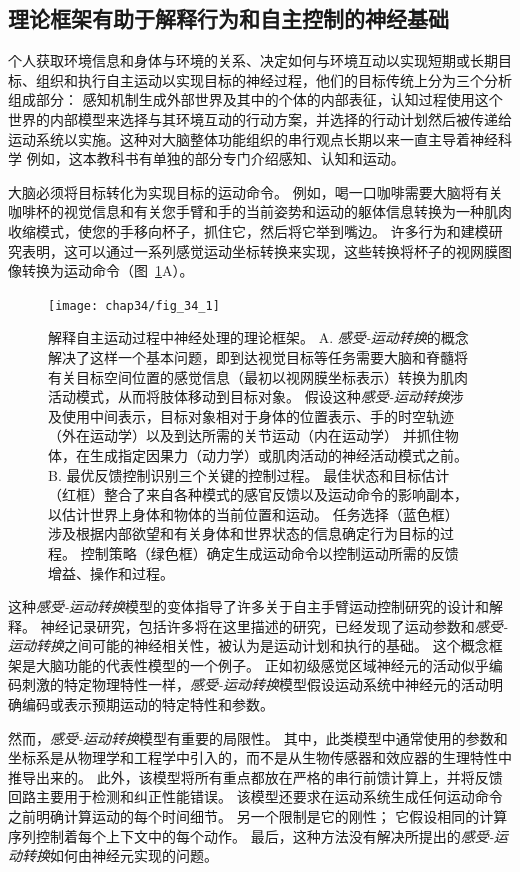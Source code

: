 \subsection{理论框架有助于解释行为和自主控制的神经基础}

个人获取环境信息和身体与环境的关系、决定如何与环境互动以实现短期或长期目标、组织和执行自主运动以实现目标的神经过程，他们的目标传统上分为三个分析组成部分：
感知机制生成外部世界及其中的个体的内部表征，认知过程使用这个世界的内部模型来选择与其环境互动的行动方案，并选择的行动计划然后被传递给运动系统以实施。这种对大脑整体功能组织的串行观点长期以来一直主导着神经科学
例如，这本教科书有单独的部分专门介绍感知、认知和运动。


大脑必须将目标转化为实现目标的运动命令。
例如，喝一口咖啡需要大脑将有关咖啡杯的视觉信息和有关您手臂和手的当前姿势和运动的躯体信息转换为一种肌肉收缩模式，使您的手移向杯子，抓住它，然后将它举到嘴边。
许多行为和建模研究表明，这可以通过一系列感觉运动坐标转换来实现，这些转换将杯子的视网膜图像转换为运动命令（图~\ref{fig:34_1}A）。


\begin{figure}[htbp]
	\centering
	\texttt{[image: chap34/fig\_34\_1]}
	\caption{解释自主运动过程中神经处理的理论框架。
		A. \textit{感受-运动转换}的概念解决了这样一个基本问题，即到达视觉目标等任务需要大脑和脊髓将有关目标空间位置的感觉信息（最初以视网膜坐标表示）转换为肌肉活动模式，从而将肢体移动到目标对象。 
		假设这种\textit{感受-运动转换}涉及使用中间表示，目标对象相对于身体的位置表示、手的时空轨迹（外在运动学）以及到达所需的关节运动（内在运动学） 并抓住物体，在生成指定因果力（动力学）或肌肉活动的神经活动模式之前。 
		B. 最优反馈控制识别三个关键的控制过程。 
		最佳状态和目标估计（红框）整合了来自各种模式的感官反馈以及运动命令的影响副本，以估计世界上身体和物体的当前位置和运动。
		任务选择（蓝色框）涉及根据内部欲望和有关身体和世界状态的信息确定行为目标的过程。
		控制策略（绿色框）确定生成运动命令以控制运动所需的反馈增益、操作和过程。}
	\label{fig:34_1}
\end{figure}


这种\textit{感受-运动转换}模型的变体指导了许多关于自主手臂运动控制研究的设计和解释。
神经记录研究，包括许多将在这里描述的研究，已经发现了运动参数和\textit{感受-运动转换}之间可能的神经相关性，被认为是运动计划和执行的基础。
这个概念框架是大脑功能的代表性模型的一个例子。
正如初级感觉区域神经元的活动似乎编码刺激的特定物理特性一样，\textit{感受-运动转换}模型假设运动系统中神经元的活动明确编码或表示预期运动的特定特性和参数。


然而，\textit{感受-运动转换}模型有重要的局限性。
其中，此类模型中通常使用的参数和坐标系是从物理学和工程学中引入的，而不是从生物传感器和效应器的生理特性中推导出来的。
此外，该模型将所有重点都放在严格的串行前馈计算上，并将反馈回路主要用于检测和纠正性能错误。
该模型还要求在运动系统生成任何运动命令之前明确计算运动的每个时间细节。
另一个限制是它的刚性；
它假设相同的计算序列控制着每个上下文中的每个动作。
最后，这种方法没有解决所提出的\textit{感受-运动转换}如何由神经元实现的问题。


